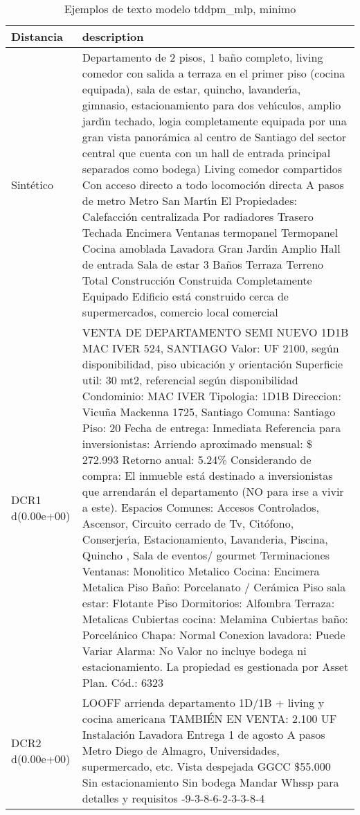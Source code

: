 \begin{table}[H]
\centering
\fontsize{10}{14}\selectfont
\caption{Ejemplos de texto modelo tddpm\_mlp, minimo}
\label{table-example-economicos-a-1-tddpm_mlp-min-text}
\begin{tabular}{|l|m{35em}|}
\hline
\rowcolor[gray]{0.8}
Distancia & description \\
\hline Sintético & Departamento de 2 pisos, 1 ba\~no completo, living comedor con salida a terraza en el primer piso (cocina equipada), sala de estar, quincho, lavander{\'\i}a, gimnasio, estacionamiento para dos veh{\'\i}culos, amplio jard{\'\i}n techado, logia completamente equipada por una gran vista panor\'amica al centro de Santiago del sector central que cuenta con un hall de entrada principal separados como bodega) Living comedor compartidos Con acceso directo a todo locomoci\'on directa A pasos de metro Metro San Mart{\'\i}n El Propiedades: Calefacci\'on centralizada Por radiadores Trasero Techada Encimera Ventanas termopanel Termopanel Cocina amoblada Lavadora Gran Jard{\'\i}n Amplio Hall de entrada Sala de estar 3 Ba\~nos Terraza Terreno Total Construcci\'on Construida Completamente Equipado Edificio est\'a construido cerca de supermercados, comercio local comercial \\
\hline DCR1 d(0.00e+00) & VENTA DE DEPARTAMENTO SEMI NUEVO 1D1B MAC IVER 524, SANTIAGO  Valor: UF 2100, seg\'un disponibilidad, piso ubicaci\'on y orientaci\'on Superficie util: 30 mt2, referencial seg\'un disponibilidad Condominio: MAC IVER Tipologia: 1D1B Direccion: Vicu\~na Mackenna 1725, Santiago Comuna: Santiago Piso: 20 Fecha de entrega: Inmediata  Referencia para inversionistas: Arriendo aproximado mensual: \$ 272.993 Retorno anual: 5.24\%  Considerando de compra: El inmueble est\'a destinado a inversionistas que arrendar\'an el departamento (NO para irse a vivir a este).  Espacios Comunes: Accesos Controlados, Ascensor, Circuito cerrado de Tv, Cit\'ofono, Conserjer{\'\i}a, Estacionamiento, Lavanderia, Piscina, Quincho , Sala de eventos/ gourmet  Terminaciones Ventanas: Monolitico Metalico Cocina: Encimera Metalica Piso Ba\~no: Porcelanato / Cer\'amica Piso sala estar: Flotante Piso Dormitorios: Alfombra Terraza: Metalicas Cubiertas cocina: Melamina Cubiertas ba\~no: Porcel\'anico Chapa: Normal Conexion lavadora: Puede Variar Alarma: No  Valor no incluye bodega ni estacionamiento.  La propiedad es gestionada por Asset Plan.  C\'od.: 6323 \\
\hline DCR2 d(0.00e+00) & LOOFF arrienda departamento 1D/1B + living y cocina americana TAMBI\'EN EN VENTA: 2.100 UF Instalaci\'on Lavadora Entrega 1 de agosto A pasos Metro Diego de Almagro, Universidades, supermercado, etc. Vista despejada GGCC \$55.000 Sin estacionamiento Sin bodega Mandar Whssp para detalles y requisitos -9-3-8-6-2-3-3-8-4 \\
\hline
\end{tabular}
\end{table}
